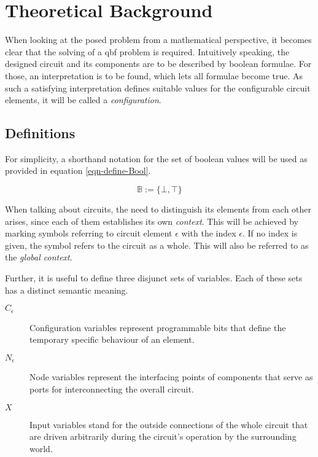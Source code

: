 \section{Theoretical Background}
	\label{sec-theoretical-background}
	
	When looking at the posed problem from a mathematical perspective, it becomes clear that the solving of a \gls{qbf} problem is required.
	Intuitively speaking, the designed circuit and its components are to be described by boolean formulae. 
	For those, an interpretation is to be found, which lets all formulae become true.
	As such a satisfying interpretation defines suitable values for the configurable circuit elements, it will be called a \emph{configuration}.

\subsection{Definitions}
	\label{sec-definitions}
	
	For simplicity, a shorthand notation for the set of boolean values will be used as provided in equation \ref{eqn-define-Bool}.
	
	\begin{equation}
		\label{eqn-define-Bool}
		\mathbb{B} := \lbrace \bot, \top \rbrace
	\end{equation}

	When talking about circuits, the need to distinguish its elements from each other arises, since each of them establishes its own \emph{context}.
	This will be achieved by marking symbols referring to circuit element $\epsilon$ with the index $\epsilon$.
	If no index is given, the symbol refers to the circuit as a whole.
	This will also be referred to as the \emph{global context}.

	Further, it is useful to define three disjunct sets of variables. 
	Each of these sets has a distinct semantic meaning.
	
	\begin{description}
		\item[$C_\epsilon$] Configuration variables represent programmable bits that define the temporary specific behaviour of an element.
		
		\item[$N_\epsilon$] Node variables represent the interfacing points of components that serve as ports for interconnecting the overall circuit.
		
		\item[$X$] Input variables stand for the outside connections of the whole circuit that are driven arbitrarily during the circuit's operation by the surrounding world.
	\end{description}
	
